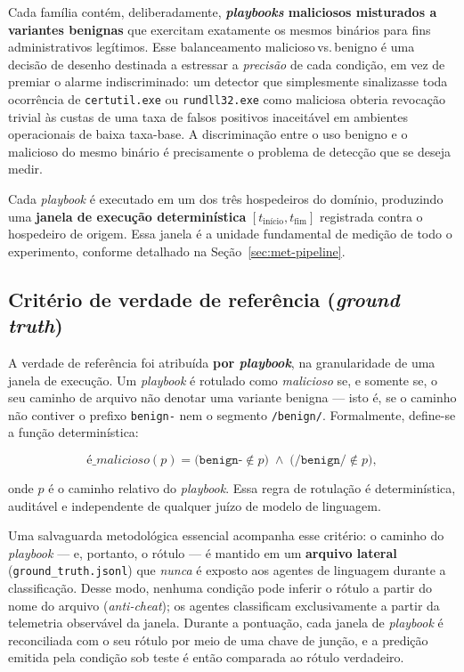 Cada família contém, deliberadamente, \textbf{\textit{playbooks} maliciosos
misturados a variantes benignas} que exercitam exatamente os mesmos binários
para fins administrativos legítimos. Esse balanceamento malicioso\,vs.\,benigno
é uma decisão de desenho destinada a estressar a \emph{precisão} de cada
condição, em vez de premiar o alarme indiscriminado: um detector que simplesmente
sinalizasse toda ocorrência de \texttt{certutil.exe} ou \texttt{rundll32.exe}
como maliciosa obteria revocação trivial às custas de uma taxa de falsos
positivos inaceitável em ambientes operacionais de baixa taxa-base. A
discriminação entre o uso benigno e o malicioso do mesmo binário é precisamente
o problema de detecção que se deseja medir.

Cada \textit{playbook} é executado em um dos três hospedeiros do domínio,
produzindo uma \textbf{janela de execução determinística}
$[t_{\text{início}}, t_{\text{fim}}]$ registrada contra o hospedeiro de origem.
Essa janela é a unidade fundamental de medição de todo o experimento, conforme
detalhado na Seção~\ref{sec:met-pipeline}.

\subsection{Critério de verdade de referência (\textit{ground truth})}

A verdade de referência foi atribuída \textbf{por \textit{playbook}}, na
granularidade de uma janela de execução. Um \textit{playbook} é rotulado como
\emph{malicioso} se, e somente se, o seu caminho de arquivo não denotar uma
variante benigna --- isto é, se o caminho não contiver o prefixo
\texttt{benign-} nem o segmento \texttt{/benign/}. Formalmente, define-se a
função determinística:

\begin{equation}
\textit{é\_malicioso}(p) =
\bigl(\texttt{benign-} \notin p\bigr)
\;\wedge\;
\bigl(\texttt{/benign/} \notin p\bigr),
\label{eq:ground-truth}
\end{equation}

\noindent onde $p$ é o caminho relativo do \textit{playbook}. Essa regra de
rotulação é determinística, auditável e independente de qualquer juízo de modelo
de linguagem.

Uma salvaguarda metodológica essencial acompanha esse critério: o caminho do
\textit{playbook} --- e, portanto, o rótulo --- é mantido em um \textbf{arquivo
lateral} (\texttt{ground\_truth.jsonl}) que \emph{nunca} é exposto aos agentes de
linguagem durante a classificação. Desse modo, nenhuma condição pode inferir o
rótulo a partir do nome do arquivo (\textit{anti-cheat}); os agentes classificam
exclusivamente a partir da telemetria observável da janela. Durante a pontuação,
cada janela de \textit{playbook} é reconciliada com o seu rótulo por meio de uma
chave de junção, e a predição emitida pela condição sob teste é então comparada
ao rótulo verdadeiro.

